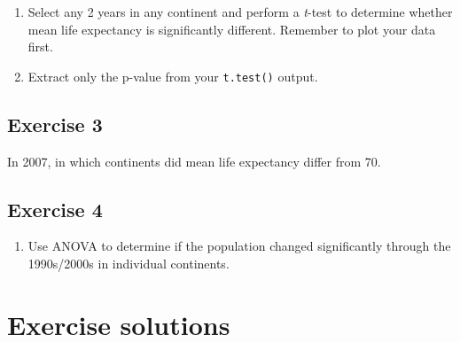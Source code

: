 \documentclass[12pt,]{krantz}
\providecommand{\tightlist}{%
  \setlength{\itemsep}{0pt}\setlength{\parskip}{0pt}}
\theoremstyle{definition}
\theoremstyle{definition}
\theoremstyle{definition}
\theoremstyle{remark}
\begin{document}
\begin{enumerate}
\def\labelenumi{\arabic{enumi}.}
\item
  Select any 2 years in any continent and perform a \emph{t}-test to
  determine whether mean life expectancy is significantly different.
  Remember to plot your data first.
\item
  Extract only the p-value from your \texttt{t.test()} output.
\end{enumerate}

\hypertarget{exercise-3-1}{%
\subsection{Exercise 3}\label{exercise-3-1}}

In 2007, in which continents did mean life expectancy differ from 70.

\hypertarget{exercise-4-1}{%
\subsection{Exercise 4}\label{exercise-4-1}}

\begin{enumerate}
\def\labelenumi{\arabic{enumi}.}
\tightlist
\item
  Use ANOVA to determine if the population changed significantly through
  the 1990s/2000s in individual continents.
\end{enumerate}

\hypertarget{exercise-solutions}{%
\section{Exercise solutions}\label{exercise-solutions}}
\end{document}
